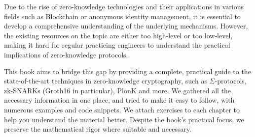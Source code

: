 Due to the rise of zero-knowledge technologies and their applications in
various fields such as Blockchain or anonymous identity management, it is
essential to develop a comprehensive understanding of the underlying
mechanisms. However, the existing resources on the topic are either too
high-level or too low-level, making it hard for regular practicing engineers
to understand the practical implications of zero-knowledge protocols.

This book aims to bridge this gap by providing a complete, practical guide
to the state-of-the-art techniques in zero-knowledge cryptography, such as
$\Sigma$-protocols, zk-SNARKs (Groth16 in particular), PlonK and more. We
gathered all the necessary information in one place, and tried to make it
easy to follow, with numerous examples and code snippets. We attach
exercises to each chapter to help you understand the material better.
Despite the book's practical focus, we preserve the mathematical rigor where
suitable and necessary.

